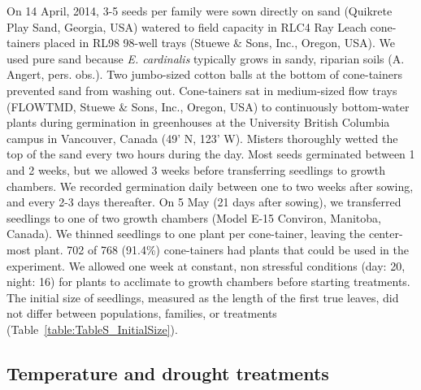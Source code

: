 \documentclass[11pt, oneside]{article}
\begin{document}
On 14 April, 2014, 3-5 seeds per family were sown directly on sand (Quikrete Play Sand, Georgia, USA) watered to field capacity in RLC4 Ray Leach cone-tainers placed in RL98 98-well trays (Stuewe \& Sons, Inc., Oregon, USA). We used pure sand because \textit{E. cardinalis} typically grows in sandy, riparian soils (A. Angert, pers. obs.). Two jumbo-sized cotton balls at the bottom of cone-tainers prevented sand from washing out. Cone-tainers sat in medium-sized flow trays (FLOWTMD, Stuewe \& Sons, Inc., Oregon, USA) to continuously bottom-water plants during germination in greenhouses at the University British Columbia campus in Vancouver, Canada (49' N, 123' W). Misters thoroughly wetted the top of the sand every two hours during the day. Most seeds germinated between 1 and 2 weeks, but we allowed 3 weeks before transferring seedlings to growth chambers. We recorded germination daily between one to two weeks after sowing, and every 2-3 days thereafter. On 5 May (21 days after sowing), we transferred seedlings to one of two growth chambers (Model E-15 Conviron, Manitoba, Canada). We thinned seedlings to one plant per cone-tainer, leaving the center-most plant. 702 of 768 (91.4\%) cone-tainers had plants that could be used in the experiment. We allowed one week at constant, non stressful conditions (day: 20\celsius, night: 16\celsius) for plants to acclimate to growth chambers before starting treatments. The initial size of seedlings, measured as the length of the first true leaves, did not differ between populations, families, or treatments (Table~\ref{table:TableS_InitialSize}).
    
\subsection*{Temperature and drought treatments}
\end{document}
